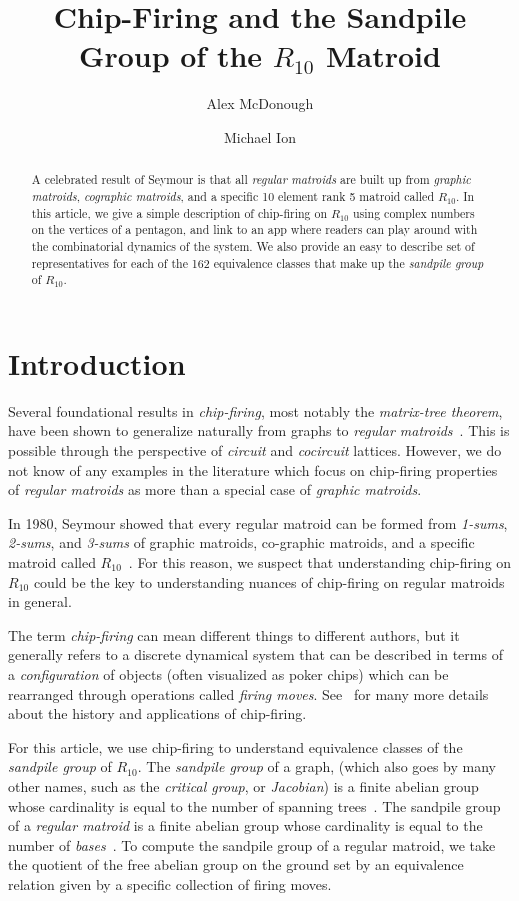 \documentclass[12p]{amsart}
\title{Chip-Firing and the Sandpile Group of the $R_{10}$ Matroid}
\author{Alex McDonough}
\author{Michael Ion}
\date{}
\numberwithin{equation}{section}
\theoremstyle{plain}
\theoremstyle{definition}
\begin{document}
\begin{abstract}A celebrated result of Seymour is that all \emph{regular matroids} are built up from \emph{graphic matroids}, \emph{cographic matroids}, and a specific 10 element rank 5 matroid called $R_{10}$. In this article, we give a simple description of chip-firing on $R_{10}$ using complex numbers on the vertices of a pentagon, and link to an app where readers can play around with the combinatorial dynamics of the system. We also provide an easy to describe set of representatives for each of the 162 equivalence classes that make up the \emph{sandpile group} of $R_{10}$. \end{abstract}

\maketitle

\section{Introduction}

Several foundational results in \emph{chip-firing}, most notably the \emph{matrix-tree theorem}, have been shown to generalize naturally from graphs to \emph{regular matroids}~\cite{Merino}. This is possible through the perspective of \emph{circuit} and \emph{cocircuit} lattices. However, we do not know of any examples in the literature which focus on chip-firing properties of \emph{regular matroids} as more than a special case of \emph{graphic matroids}. 

In 1980, Seymour showed that every regular matroid can be formed from \emph{1-sums}, \emph{2-sums}, and \emph{3-sums} of graphic matroids, co-graphic matroids, and a specific matroid called $R_{10}$~\cite{Seymour}. For this reason, we suspect that understanding chip-firing on $R_{10}$ could be the key to understanding nuances of chip-firing on regular matroids in general. 

The term \emph{chip-firing} can mean different things to different authors, but it generally refers to a discrete dynamical system that can be described in terms of a \emph{configuration} of objects (often visualized as poker chips) which can be rearranged through operations called \emph{firing moves}. See~\cite{Klivans} for many more details about the history and applications of chip-firing.

For this article, we use chip-firing to understand equivalence classes of the \emph{sandpile group} of $R_{10}$. The \emph{sandpile group} of a graph, (which also goes by many other names, such as the \emph{critical group}, or \emph{Jacobian}) is a finite abelian group whose cardinality is equal to the number of spanning trees~\cite{Biggs99}. The sandpile group of a \emph{regular matroid} is a finite abelian group whose cardinality is equal to the number of \emph{bases}~\cite{Merino}. To compute the sandpile group of a regular matroid, we take the quotient of the free abelian group on the ground set by an equivalence relation given by a specific collection of firing moves. 
\end{document}
